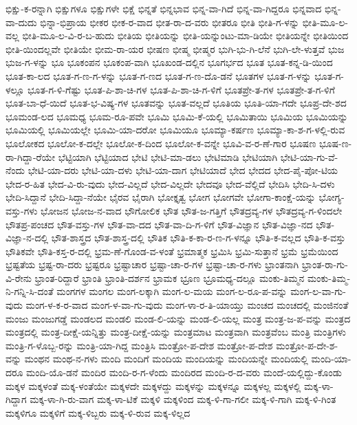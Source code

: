 {ಭಿಕ್ಷು-ಕ-ರನ್ನಾಗಿ
ಭಿಕ್ಷುಗಳೂ
ಭಿಕ್ಷುಗಳೇ
ಭಿಕ್ಷೆ
ಭಿನ್ನತೆ
ಭಿನ್ನಭಾವ
ಭಿನ್ನ-ವಾ-ಗಿದೆ
ಭಿನ್ನ-ವಾ-ಗಿದ್ದರೂ
ಭಿನ್ನವಾದ
ಭಿನ್ನ-ವಾ-ದುದು
ಭಿನ್ನಾ-ಭಿಪ್ರಾಯ
ಭೀಕರ
ಭೀಕ-ರ-ವಾದ
ಭೀತ-ರಾ-ದ-ವರು
ಭೀತರೂ
ಭೀತಿ
ಭೀತಿ-ಗ-ಳನ್ನು
ಭೀತಿ-ಮೂ-ಲ-ವಲ್ಲ
ಭೀತಿ-ಮೂ-ಲ-ವಿ-ರ-ಬ-ಹುದು
ಭೀತಿಯ
ಭೀತಿಯನ್ನು
ಭೀತಿ-ಯನ್ನುಂಟು-ಮಾ-ಡಿಯೇ
ಭೀತಿಯನ್ನೇ
ಭೀತಿಯಿಂದ
ಭೀತಿ-ಯಿಂದಲ್ಲವೇ
ಭೀತಿಯೇ
ಭೀಮ-ರಾ-ಯರ
ಭೀಷಣ
ಭೀಷ್ಮ
ಭೀಷ್ಮರ
ಭುಗಿ-ಭು-ಗಿ-ಲೆನೆ
ಭುಗಿ-ಲೇ-ಳುತ್ತವೆ
ಭುಜ
ಭುಜ-ಗ-ಳನ್ನು
ಭೂ
ಭೂಕಂಪನ
ಭೂಕಂಪ-ವಾಗಿ
ಭೂಖಂಡ-ದಲ್ಲಿನ
ಭೂಗರ್ಭದ
ಭೂತ
ಭೂತ-ಕನ್ನ-ಡಿ-ಯಿಂದ
ಭೂತ-ಕಾ-ಲದ
ಭೂತ-ಗ-ಣ-ಗ-ಳನ್ನು
ಭೂತ-ಗ-ಣದ
ಭೂತ-ಗ-ಣ-ದೊ-ಡನೆ
ಭೂತಗಳ
ಭೂತ-ಗ-ಳನ್ನು
ಭೂತ-ಗ-ಳಲ್ಲೂ
ಭೂತ-ಗ-ಳಿ-ಗೆಷ್ಟು
ಭೂತ-ಪಿ-ಶಾ-ಚಿ-ಗಳ
ಭೂತ-ಪಿ-ಶಾ-ಚಿ-ಗ-ಳಿಗೆ
ಭೂತಪ್ರೇ-ತ-ಗಳ
ಭೂತಪ್ರೇ-ತ-ಗ-ಳಿಗೆ
ಭೂತ-ಬಾ-ಧೆ-ಯಿದೆ
ಭೂತ-ಭ-ವಿಷ್ಯ-ಗಳ
ಭೂತವನ್ನು
ಭೂತ-ವಲ್ಲದೆ
ಭೂತಿಯ
ಭೂತಿ-ಯಾ-ಗದೇ
ಭೂಪ್ರ-ದೇ-ಶದ
ಭೂಮಂಡ-ಲದ
ಭೂಮಧ್ಯ
ಭೂಮ-ರೂ-ಪವೇ
ಭೂಮಿ
ಭೂಮಿ-ಕೆ-ಯಲ್ಲಿ
ಭೂಮಿತಾಯಿ
ಭೂಮಿಯ
ಭೂಮಿಯನ್ನು
ಭೂಮಿಯಲ್ಲಿ
ಭೂಮಿಯಲ್ಲೇ
ಭೂಮಿ-ಯಾ-ದರೋ
ಭೂಮಿಯೂ
ಭೂಮ್ಯಾ-ಕರ್ಷಣ
ಭೂಮ್ಯಾ-ಕಾ-ಶ-ಗ-ಳಲ್ಲಿ-ರುವ
ಭೂಲೋಕದ
ಭೂಲೋ-ಕ-ದಲ್ಲೇ
ಭೂಲೋ-ಕ-ದಿಂದ
ಭೂಲೋ-ಕ-ವನ್ನೇ
ಭೂವಿ-ವ-ರ-ಣೆ-ಗಾರ
ಭೂಷಣ
ಭೂಷ-ಣ-ರಾ-ಗಿದ್ದಾ-ರೆಯೇ
ಭೆಟ್ಟಿಯಾಗಿ
ಭೆಟ್ಟಿಯಾದ
ಭೇಟಿ
ಭೇಟಿ-ಮಾ-ಡಲು
ಭೇಟಿಮಾಡಿ
ಭೇಟಿಯಾಗಿ
ಭೇಟಿ-ಯಾ-ಗು-ವೆ-ನೆಂದು
ಭೇಟಿ-ಯಾ-ದರು
ಭೇಟಿ-ಯಾ-ದಳು
ಭೇಟಿ-ಯಾ-ದಾಗ
ಭೇಟಿಯಾದೆ
ಭೇದ
ಭೇದದ
ಭೇದ-ಪೈ-ಪೋ-ಟಿಯ
ಭೇದ-ರ-ಹಿತ
ಭೇದ-ವಿ-ರು-ವುದು
ಭೇದ-ವಿಲ್ಲದೆ
ಭೇದ-ವಿಲ್ಲದೇ
ಭೇದವೂ
ಭೇದ-ವೆಲ್ಲಿದೆ
ಭೇದಿಸಿ
ಭೇದಿ-ಸಿ-ದಳು
ಭೇದಿ-ಸಿದ್ದಾನೆ
ಭೇದಿ-ಸಿದ್ದಾ-ನೆಯೇ
ಭೈರವ
ಭೈರಾಗಿ
ಭೋಕ್ತೃತ್ವ
ಭೋಗ
ಭೋಗವೇ
ಭೋಗಾ-ಕಾಂಕ್ಷೆ-ಯನ್ನು
ಭೋಗ್ಯ-ವಸ್ತು-ಗಳು
ಭೋಜನ
ಭೋಜ-ನ-ವಾದ
ಭೌಗೋಲಿಕ
ಭೌತ
ಭೌತ-ಜ-ಗತ್ತಿಗೆ
ಭೌತದ್ರವ್ಯ-ಗಳ
ಭೌತದ್ರವ್ಯ-ಗ-ಳಿಂದಲೇ
ಭೌತಪ್ರ-ಪಂಚದ
ಭೌತ-ವಸ್ತು-ಗಳ
ಭೌತ-ವಾ-ದದ
ಭೌತ-ವಾ-ದಿ-ಗ-ಳಿಗೆ
ಭೌತ-ವಿಜ್ಞಾನ
ಭೌತ-ವಿಜ್ಞಾ-ನದ
ಭೌತ-ವಿಜ್ಞಾ-ನ-ದಲ್ಲಿ
ಭೌತ-ಶಾಸ್ತ್ರದ
ಭೌತ-ಶಾಸ್ತ್ರ-ದಲ್ಲಿ
ಭೌತಿಕ
ಭೌತಿ-ಕ-ಕಾ-ರ-ಣ-ಗ-ಳನ್ನೂ
ಭೌತಿ-ಕ-ವಲ್ಲದ
ಭೌತಿ-ಕ-ವಸ್ತು
ಭೌತಿಕವೇ
ಭೌತಿ-ಕಸ್ತ-ರ-ದಲ್ಲಿ
ಭ್ರಮ-ಣೆ-ಗೊಂಡ-ವ-ಳಂತೆ
ಭ್ರಮಾತ್ಮಕ
ಭ್ರಮಿಸಿ
ಭ್ರಮಿ-ಸುತ್ತಾನೆ
ಭ್ರಮೆ
ಭ್ರಮೆಯಿಂದ
ಭ್ರಷ್ಟತೆಯ
ಭ್ರಷ್ಟ-ರಾ-ದರು
ಭ್ರಷ್ಟರೂ
ಭ್ರಷ್ಟಾಚಾರ
ಭ್ರಷ್ಟಾ-ಚಾ-ರ-ಗಳ
ಭ್ರಷ್ಟಾ-ಚಾ-ರ-ಗಳು
ಭ್ರಾಂತನಾಗಿ
ಭ್ರಾಂತ-ರಾ-ಗು-ವಿ-ರೇನು
ಭ್ರಾಂತ-ರಿದ್ದಾರೆ
ಭ್ರಾಂತಿ
ಭ್ರಾಂತಿ-ದರ್ಶನ
ಭ್ರಾಮಕ
ಭ್ರೂಣ
ಭ್ರೂಮಧ್ಯ-ದಲ್ಲೂ
ಮಂಕು-ತಿಮ್ಮನ
ಮಂಕು-ತಿಮ್ಮ-ನಿ-ಗನ್ನಿ-ಸಿ-ದಂತೆ
ಮಂಗಗಳ
ಮಂಗಲ
ಮಂಗ-ಲಕ್ಕಾಗಿ
ಮಂಗ-ಲ-ಮಯ
ಮಂಗ-ಲ-ರೂ-ಪ-ವನ್ನು
ಮಂಗ-ಲ-ವಾ-ಗು-ವುದು
ಮಂಗ-ಳ-ಕ-ರ-ವಾದ
ಮಂಗ-ಳ-ವಾ-ಗು-ವುದು
ಮಂಗ-ಳಾ-ರ-ತಿ-ಯಾಯ್ತು
ಮಂಚದ
ಮಂಚದಲ್ಲಿ
ಮಂಜಿನಂತೆ
ಮಂಜು
ಮಂಜುಗಡ್ಡೆ
ಮಂಡಲದ
ಮಂಡಲಿ
ಮಂಡ-ಲಿ-ಯನ್ನು
ಮಂಡ-ಲಿ-ಯಲ್ಲ
ಮಂತ್ರ
ಮಂತ್ರ-ಜ-ಪ-ವನ್ನು
ಮಂತ್ರದ
ಮಂತ್ರದಲ್ಲಿ
ಮಂತ್ರ-ದೀಕ್ಷೆ-ಯನ್ನಿತ್ತು
ಮಂತ್ರ-ದೀಕ್ಷೆ-ಯನ್ನು
ಮಂತ್ರಮಾಟ
ಮಂತ್ರವಾಗಿ
ಮಂತ್ರವೆಂಬ
ಮಂತ್ರಿ
ಮಂತ್ರಿಗಳು
ಮಂತ್ರಿ-ಗ-ಳೊಬ್ಬ-ರನ್ನು
ಮಂತ್ರಿ-ಯಾ-ಗಿದ್ದ
ಮಂತ್ರಿಸಿ
ಮಂತ್ರೋ-ಪ-ದೇಶ
ಮಂತ್ರೋ-ಪ-ದೇಶ
ಮಂತ್ರೋ-ಪ-ದೇ-ಶ-ವನ್ನು
ಮಂಥನ
ಮಂಥ-ನ-ಗಳು
ಮಂದಿ
ಮಂದಿಗೆ
ಮಂದಿಯ
ಮಂದಿಯನ್ನು
ಮಂದಿಯನ್ನೇ
ಮಂದಿಯಲ್ಲಿ
ಮಂದಿ-ಯಾ-ದರೂ
ಮಂದಿ-ಯೊ-ಡನೆ
ಮಂದಿರ
ಮಂದಿ-ರ-ಗ-ಳೆಂದು
ಮಂದಿರದ
ಮಂದಿ-ರ-ದ-ವರು
ಮಂದೆ-ಯಲ್ಲಿದ್ದು-ಕೊಂಡು
ಮಕ್ಕಳ
ಮಕ್ಕಳಂತೆ
ಮಕ್ಕ-ಳಂತೆಯೇ
ಮಕ್ಕಳದೇ
ಮಕ್ಕಳದ್ದು
ಮಕ್ಕಳನ್ನು
ಮಕ್ಕಳನ್ನೂ
ಮಕ್ಕಳಲ್ಲ
ಮಕ್ಕಳಲ್ಲಿ
ಮಕ್ಕ-ಳಾ-ಗಿದ್ದಾಗ
ಮಕ್ಕ-ಳಾ-ಗಿ-ರು-ವಾಗ
ಮಕ್ಕ-ಳಾ-ಟಿಕೆ
ಮಕ್ಕಳಿ
ಮಕ್ಕಳಿಂದ
ಮಕ್ಕ-ಳಿ-ಗಾ-ಗಲೀ
ಮಕ್ಕ-ಳಿ-ಗಾಗಿ
ಮಕ್ಕ-ಳಿ-ಗಿಂತ
ಮಕ್ಕಳಿಗೂ
ಮಕ್ಕಳಿಗೆ
ಮಕ್ಕ-ಳಿಬ್ಬರು
ಮಕ್ಕ-ಳಿ-ರುವ
ಮಕ್ಕ-ಳಿಲ್ಲದ
}
